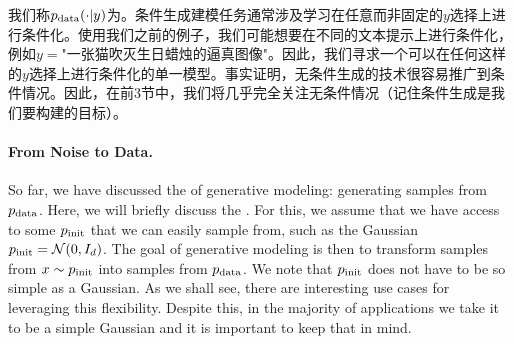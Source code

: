 我们称$p_{\rm{data}}(\cdot|y)$为。条件生成建模任务通常涉及学习在任意而非固定的$y$选择上进行条件化。使用我们之前的例子，我们可能想要在不同的文本提示上进行条件化，例如$y=$"一张猫吹灭生日蜡烛的逼真图像"。因此，我们寻求一个可以在任何这样的$y$选择上进行条件化的单一模型。事实证明，无条件生成的技术很容易推广到条件情况。因此，在前3节中，我们将几乎完全关注无条件情况（记住条件生成是我们要构建的目标）。



\paragraph{From Noise to Data.} So far, we have discussed the  of generative modeling: generating samples from $p_{\rm{data}}$. Here, we will briefly discuss the . For this, we assume that we have access to some  $p_{\rm{init}}$ that we can easily sample from, such as the Gaussian $p_{\rm{init}}=\mathcal{N}(0,I_d)$. The goal of generative modeling is then to transform samples from $x\sim p_{\rm{init}}$ into samples from $p_{\rm{data}}$. We note that $p_{\rm{init}}$ does not have to be so simple as a Gaussian. As we shall see, there are interesting use cases for leveraging this flexibility. Despite this, in the majority of applications we take it to be a simple Gaussian and it is important to keep that in mind.

